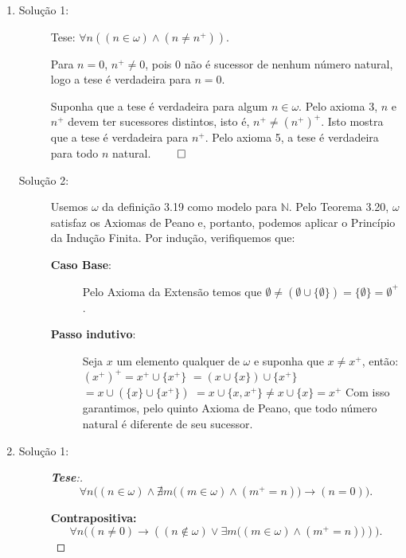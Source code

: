 \begin{enumerate}[label=(\alph{*})]
	\item 
		\begin{description}
			\item[Solução 1:] Tese: $\forall n((n\in\omega)\wedge(n\neq n^+))$.
	
			Para $n=0$, $n^+\neq0$, pois $0$ não é sucessor de nenhum número natural, logo a tese é verdadeira para $n=0$.
			
			Suponha que a tese é verdadeira para algum $n\in\omega$. Pelo axioma 3, $n$ e $n^+$ devem ter sucessores distintos, isto é, $n^+\neq(n^+)^+$. Isto mostra que a tese é verdadeira para $n^+$. Pelo axioma 5, a tese é verdadeira para todo $n$ natural. $\qed$
			\item[Solução 2:] Usemos $\omega$ da definição 3.19 como modelo para $\mathbb{N}$. Pelo Teorema 3.20, $\omega$ satisfaz os Axiomas de Peano e, portanto, podemos aplicar o Princípio da Indução Finita. Por indução, verifiquemos que:
				\begin{description}
					\item[\textbf{Caso Base}:] Pelo Axioma da Extensão temos que $\emptyset \neq (\emptyset \cup \{\emptyset\}) = \{\emptyset\} = \emptyset^+$.
					\item[\textbf{Passo indutivo}:] Seja $x$ um elemento qualquer de $\omega$ e suponha que $x \neq x^+$, então: \newline \newline $(x^+)^+ = x^+ \cup \{x^+\}$ \newline $=  (x \cup \{x\}) \cup \{x^+\}$ \newline $= x \cup (\{x\} \cup \{x^+\})$ \newline $= x \cup \{x, x^+\} \neq x \cup \{x\} = x^+$ \newline \newline Com isso garantimos, pelo quinto Axioma de Peano, que todo número natural é diferente de seu sucessor. \cqd
				\end{description}
		\end{description}
	
	\item  
	\begin{description}
		\item[Solução 1:] 
		\begin{proof}[\textbf{Tese}:]
			\[
			\forall n \big((n \in \omega) \wedge \nexists m \big((m \in \omega) \wedge (m^+ = n)\big) \to (n = 0)\big).
			\]
			
			\textbf{Contrapositiva:}  
			\[
			\forall n \big((n \neq 0) \to ((n \notin \omega) \vee \exists m \big((m \in \omega) \wedge (m^+ = n)\big))\big).
			\]
			

\end{proof}
\end{description}
\end{enumerate}
